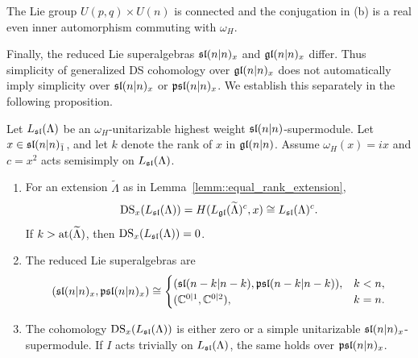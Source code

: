 \begin{remark}
    The Lie group $U(p,q)\times U(n)$ is connected and the conjugation in (b) is a real even
inner automorphism commuting with $\omega_H$.
\end{remark}

Finally, the reduced Lie superalgebras $\sl(n\vert n)_x$ and $\gl(n\vert n)_x$ differ. Thus simplicity of generalized DS cohomology over $\gl(n\vert n)_x$ does not automatically imply simplicity over $\sl(n\vert n)_x$ or $\psl(n\vert n)_x$. We establish this separately in the following proposition.

\begin{proposition}\label{prop::equal_rank_DS}
Let $L_{\sl}(\Lambda)$ be an $\omega_{H}$-unitarizable highest weight $\sl(n\vert n)$-supermodule. Let $x\in\sl(n\vert n)_{\bar1}$, and let $k$ denote the rank of $x$ in $\gl(n\vert n)$. Assume $\omega_H(x)=ix$ and $c=x^2$ acts semisimply on $L_{\sl}(\Lambda)$.
\begin{enumerate}
\item[(a)] For an extension $\widetilde\Lambda$ as in Lemma~\ref{lemm::equal_rank_extension},
\[
\DS_x(L_{\sl}(\Lambda))=H(L_{\gl}(\widetilde\Lambda)^c,x)\cong L_{\sl}(\Lambda)^c.
\]
If $k>\at(\widetilde\Lambda)$, then $\DS_x(L_{\sl}(\Lambda))=0$.

\item[(b)] The reduced Lie superalgebras are
\[
(\sl(n\vert n)_x,\psl(n\vert n)_x)\cong
\begin{cases}
(\sl(n-k\vert n-k),\psl(n-k\vert n-k)),&k<n,\\
(\CC^{0\vert1},\CC^{0\vert2}),&k=n.
\end{cases}
\]

\item[(c)] The cohomology $\DS_x(L_{\sl}(\Lambda))$ is either zero or a simple unitarizable $\sl(n\vert n)_x$-supermodule. If $I$ acts trivially on $L_{\sl}(\Lambda)$, the same holds over $\psl(n\vert n)_x$.
\end{enumerate}
\end{proposition}

